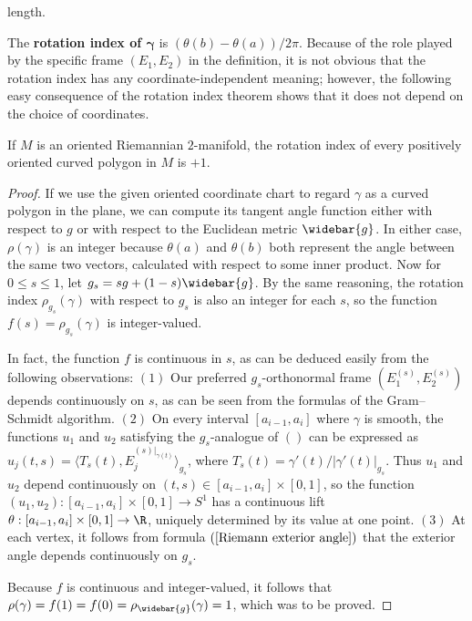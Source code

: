 length.\par
The \textbf{rotation index of $\bm{\gamma}$} is $(\theta(b)-\theta(a))/2\pi$. Because of the role played by the specific frame $(E_1,E_2)$ in the definition, it is not obvious that 
the rotation index has any coordinate-independent meaning; however, the following easy consequence of the rotation index theorem shows that it does not depend on the 
choice of coordinates.
\begin{lemma}
If $M$ is an oriented Riemannian $2$-manifold, the rotation index of every positively oriented curved polygon in $M$ is $+1$.
\end{lemma}
\begin{proof}
If we use the given oriented coordinate chart to regard $\gamma$ as a curved polygon in the plane, we can compute its tangent angle function either with respect to $g$ or 
with respect to the Euclidean metric $\widebar{g}$. In either case, $\rho(\gamma)$ is an integer because $\theta(a)$ and $\theta(b)$ both represent the angle between the 
same two vectors, calculated with respect to some inner product. Now for $0\leq s\leq 1$, let $g_s=sg+(1-s)\widebar{g}$. By the same reasoning, the rotation index 
$\rho_{g_s}(\gamma)$ with respect to $g_s$ is also an integer for each $s$, so the function $f(s)=\rho_{g_s}(\gamma)$ is integer-valued.\par
In fact, the function $f$ is continuous in $s$, as can be deduced easily from the following observations: $(1)$ Our preferred $g_s$-orthonormal frame $(E^{(s)}_1,E^{(s)}_2)$ 
depends continuously on $s$, as can be seen from the formulas of the Gram–Schmidt algorithm. $(2)$ On every interval $[a_{i-1},a_i]$ where $\gamma$ is smooth, the functions 
$u_1$ and $u_2$ satisfying the $g_s$-analogue of $()$ can be expressed as $u_j(t,s)=\langle T_s(t),E_j^{(s)|_{\gamma(t)}}\rangle_{g_s}$, where $T_s(t)=\gamma'(t)/|\gamma'(t)|_{g_s}$. 
Thus $u_1$ and $u_2$ depend continuously on $(t,s)\in[a_{i-1},a_i]\times[0,1]$, so the function $(u_1,u_2):[a_{i-1},a_i]\times[0,1]\to S^1$ has a continuous lift $\theta:[a_{i-1},a_i]\times[0,1]\to\R$, 
uniquely determined by its value at one point. $(3)$ At each vertex, it follows from formula $(\ref{Riemann exterior angle})$ that the exterior angle depends continuously 
on $g_s$.\par
Because $f$ is continuous and integer-valued, it follows that $\rho(\gamma)=f(1)=f(0)=\rho_{\widebar{g}}(\gamma)=1$, which was to be proved.
\end{proof}
